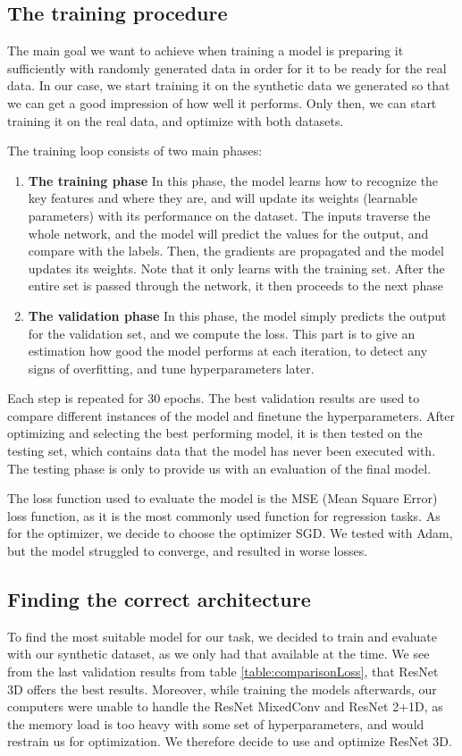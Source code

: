 \documentclass[10pt,conference]{IEEEtran}
\begin{document}
\subsection{The training procedure}
The main goal we want to achieve when training a model is preparing it sufficiently with randomly generated data in order for it to be ready for the real data. In our case, we start training it on the synthetic data we generated so that we can get a good impression of how well it performs. Only then, we can start training it on the real data, and optimize with both datasets.\par
The training loop consists of two main phases:
\begin{enumerate}
    \item {\bf The training phase} In this phase, the model learns how to recognize the key features and where they are, and will update its weights (learnable parameters) with its performance on the dataset. The inputs traverse the whole network, and the model will predict the values for the output, and compare with the labels. Then, the gradients are propagated and the model updates its weights. Note that it only learns with the training set. After the entire set is passed through the network, it then proceeds to the next phase
    \item {\bf The validation phase} In this phase, the model simply predicts the output for the validation set, and we compute the loss. This part is to give an estimation how good the model performs at each iteration, to detect any signs of overfitting, and tune hyperparameters later.
\end{enumerate}
Each step is repeated for 30 epochs. The best validation results are used to compare different instances of the model and finetune the hyperparameters. After optimizing and selecting the best performing model, it is then tested on the testing set, which contains data that the model has never been executed with. The testing phase is only to provide us with an evaluation of the final model.\par
The loss function used to evaluate the model is the MSE (Mean Square Error) loss function, as it is the most commonly used function for regression tasks. 
As for the optimizer, we decide to choose the optimizer SGD. We tested with Adam, but the model struggled to converge, and resulted in worse losses.
 
\subsection{Finding the correct architecture}
To find the most suitable model for our task, we decided to train and evaluate with our synthetic dataset, as we only had that available at the time. We see from the last validation results from table \ref{table:comparisonLoss}, that ResNet 3D offers the best results. Moreover, while training the models afterwards, our computers were unable to handle the ResNet MixedConv and ResNet 2+1D, as the memory load is too heavy with some set of hyperparameters, and would restrain us for optimization. We therefore decide to use and optimize ResNet 3D.  
\end{document}
